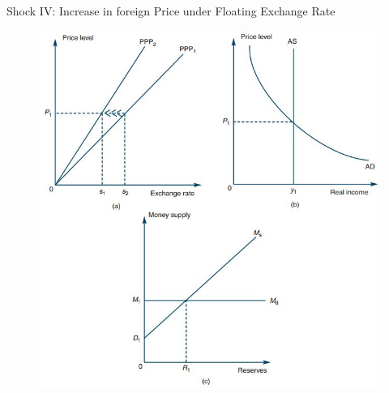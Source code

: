 \documentclass[10pt,hyperref={CJKbookmarks=true},xcolor=dvipsnames,aspectratio=169]{beamer}
\begin{document}
\begin{frame}{Shock IV: Increase in foreign Price under Floating Exchange Rate}


\begin{figure}


\includegraphics[scale=0.4]{fig/boptheory/lec08-25.JPG}

\end{figure}

\end{frame}
\end{document}
